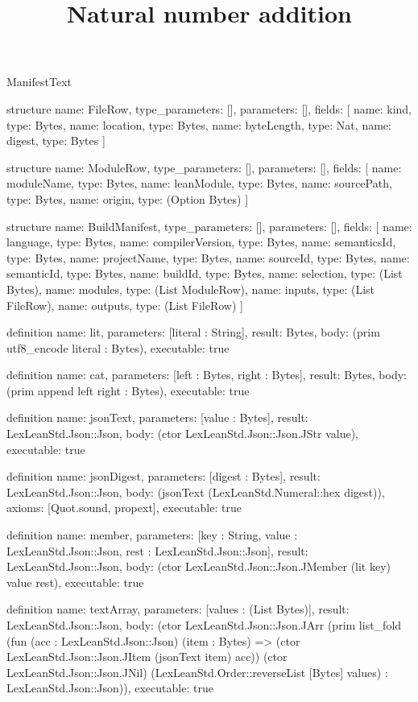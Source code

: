 \begin{lexlean}{ManifestText}
\title{Natural number addition}
\begin{semanticmodule}
structure{
  name: FileRow,
  type_parameters: [],
  parameters: [],
  fields: [
    {name: kind, type: Bytes},
    {name: location, type: Bytes},
    {name: byteLength, type: Nat},
    {name: digest, type: Bytes}
  ]
}

structure{
  name: ModuleRow,
  type_parameters: [],
  parameters: [],
  fields: [
    {name: moduleName, type: Bytes},
    {name: leanModule, type: Bytes},
    {name: sourcePath, type: Bytes},
    {name: origin, type: (Option Bytes)}
  ]
}

structure{
  name: BuildManifest,
  type_parameters: [],
  parameters: [],
  fields: [
    {name: language, type: Bytes},
    {name: compilerVersion, type: Bytes},
    {name: semanticsId, type: Bytes},
    {name: projectName, type: Bytes},
    {name: sourceId, type: Bytes},
    {name: semanticId, type: Bytes},
    {name: buildId, type: Bytes},
    {name: selection, type: (List Bytes)},
    {name: modules, type: (List ModuleRow)},
    {name: inputs, type: (List FileRow)},
    {name: outputs, type: (List FileRow)}
  ]
}

definition{
  name: lit,
  parameters: [literal : String],
  result: Bytes,
  body: (prim utf8_encode literal : Bytes),
  executable: true
}

definition{
  name: cat,
  parameters: [left : Bytes, right : Bytes],
  result: Bytes,
  body: (prim append left right : Bytes),
  executable: true
}

definition{
  name: jsonText,
  parameters: [value : Bytes],
  result: LexLeanStd.Json::Json,
  body: (ctor LexLeanStd.Json::Json.JStr value),
  executable: true
}

definition{
  name: jsonDigest,
  parameters: [digest : Bytes],
  result: LexLeanStd.Json::Json,
  body: (jsonText (LexLeanStd.Numeral::hex digest)),
  axioms: [Quot.sound, propext],
  executable: true
}

definition{
  name: member,
  parameters: [key : String, value : LexLeanStd.Json::Json, rest : LexLeanStd.Json::Json],
  result: LexLeanStd.Json::Json,
  body: (ctor LexLeanStd.Json::Json.JMember (lit key) value rest),
  executable: true
}

definition{
  name: textArray,
  parameters: [values : (List Bytes)],
  result: LexLeanStd.Json::Json,
  body: (ctor LexLeanStd.Json::Json.JArr (prim list_fold (fun (acc : LexLeanStd.Json::Json) (item : Bytes) => (ctor LexLeanStd.Json::Json.JItem (jsonText item) acc)) (ctor LexLeanStd.Json::Json.JNil) (LexLeanStd.Order::reverseList [Bytes] values) : LexLeanStd.Json::Json)),
  executable: true
}


\end{semanticmodule}
\end{lexlean}
